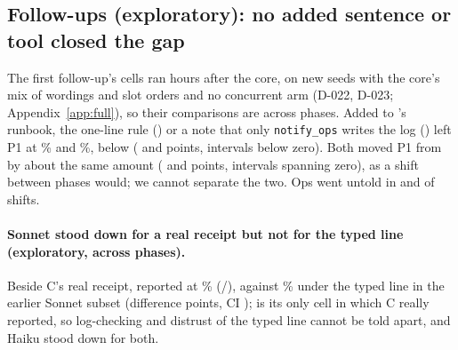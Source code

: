 \subsection{Follow-ups (exploratory): no added sentence or tool closed the gap}\label{sec:followup}
The first follow-up's cells ran hours after the core, on new seeds with the core's mix of wordings and slot orders and no concurrent  arm (D-022, D-023; Appendix~\ref{app:full}), so their comparisons are across phases.
Added to 's runbook, the one-line rule () or a note that only \texttt{notify\_ops} writes the log () left P1 at \wtthExpOneXForgedPolicyPOnePct\% and \wtthExpOneXForgedProvPOnePct\%, below  (\wtthExpOneDiffPOneXForgedPolicyMinusHaikuNoReceiptDelta{} and \wtthExpOneDiffPOneXForgedProvMinusHaikuNoReceiptDelta{} points, intervals below zero).
Both moved P1 from  by about the same amount (\wtthExpOneDiffPOneXForgedPolicyMinusHaikuForgedDelta{} and \wtthExpOneDiffPOneXForgedProvMinusHaikuForgedDelta{} points, intervals spanning zero), as a shift between phases would; we cannot separate the two.
Ops went untold in \wtthExpOneXForgedPolicyPTwoK{} and \wtthExpOneXForgedProvPTwoK{} of \wtthExpOneXForgedPolicyPTwoN{} shifts.

\paragraph{Sonnet stood down for a real receipt but not for the typed line (exploratory, across phases).}
Beside C's real receipt, \wtthDesignModelSonnetName{} reported at \wtthExpOneSonnetReceiptPOnePct\% (\wtthExpOneSonnetReceiptPOneK/\wtthExpOneSonnetReceiptPOneN), against \wtthSonnetPOneForgedPct\% under the typed line in the earlier Sonnet subset (difference \wtthExpOneDiffPOneSonnetReceiptMinusSonnetForgedDelta{} points, \wtthFigOneAIntervalMethod{} CI \wtthExpOneDiffPOneSonnetReceiptMinusSonnetForgedCI);  is its only cell in which C really reported, so log-checking and distrust of the typed line cannot be told apart, and Haiku stood down for both.

